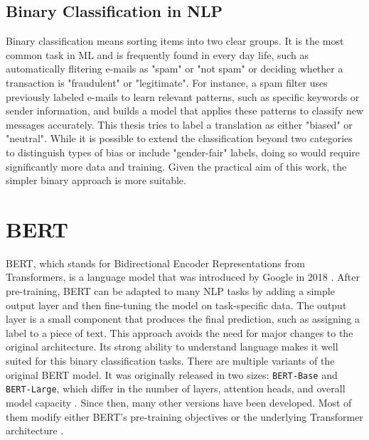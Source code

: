     \subsection{Binary Classification in NLP}
    Binary classification means sorting items into two clear groups. It is the most common task in ML and is frequently found in every day life, such as automatically flitering e-mails as "spam" or "not spam" \parencite{quemyBinaryClassificationUnstructured2019} or deciding whether a transaction is "fraudulent" or "legitimate". For instance, a spam filter uses previously labeled e-mails to learn relevant patterns, such as specific keywords or sender information, and builds a model that applies these patterns to classify new messages accurately. This thesis tries to label a translation as either "biased" or "neutral". While it is possible to extend the classification beyond two categories to distinguish types of bias or include "gender-fair" labels, doing so would require significantly more data and training. Given the practical aim of this work, the simpler binary approach is more suitable.


\section{BERT}
    BERT, which stands for Bidirectional Encoder Representations from Transformers, is a language model that was introduced by Google in 2018 \parencite{devlinBERTPretrainingDeep2019}. After pre-training, BERT can be adapted to many NLP tasks by adding a simple output layer and then fine-tuning the model on task-specific data. The output layer is a small component that produces the final prediction, such as assigning a label to a piece of text. This approach avoids the need for major changes to the original architecture. Its strong ability to understand language makes it well suited for this binary classification tasks. There are multiple variants of the original BERT model. It was originally released in two sizes: \texttt{BERT-Base} and \texttt{BERT-Large}, which differ in the number of layers, attention heads, and overall model capacity \parencite{devlinBERTPretrainingDeep2019}. Since then, many other versions have been developed. Most of them modify either BERT’s pre-training objectives or the underlying Transformer architecture \parencite{libovickyHowLanguageNeutralMultilingual2019}.

